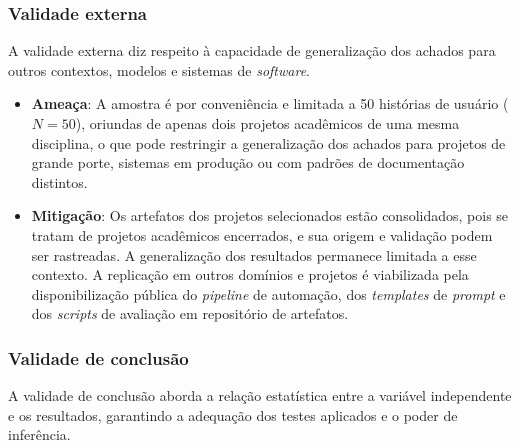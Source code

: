 \subsubsection*{Validade externa}

A validade externa diz respeito à capacidade de generalização dos achados para outros contextos, modelos e sistemas de \textit{software}.

\begin{itemize}
    \item \textbf{Ameaça}: A amostra é por conveniência e limitada a 50 histórias de usuário ($N = 50$), oriundas de apenas dois projetos acadêmicos de uma mesma disciplina, o que pode restringir a generalização dos achados para projetos de grande porte, sistemas em produção ou com padrões de documentação distintos.

    \item \textbf{Mitigação}: Os artefatos dos projetos selecionados estão consolidados, pois se tratam de projetos acadêmicos encerrados, e sua origem e validação podem ser rastreadas. A generalização dos resultados permanece limitada a esse contexto. A replicação em outros domínios e projetos é viabilizada pela disponibilização pública do \textit{pipeline} de automação, dos \textit{templates} de \textit{prompt} e dos \textit{scripts} de avaliação em repositório de artefatos.
\end{itemize}

\subsubsection*{Validade de conclusão}

A validade de conclusão aborda a relação estatística entre a variável independente e os resultados, garantindo a adequação dos testes aplicados e o poder de inferência.

